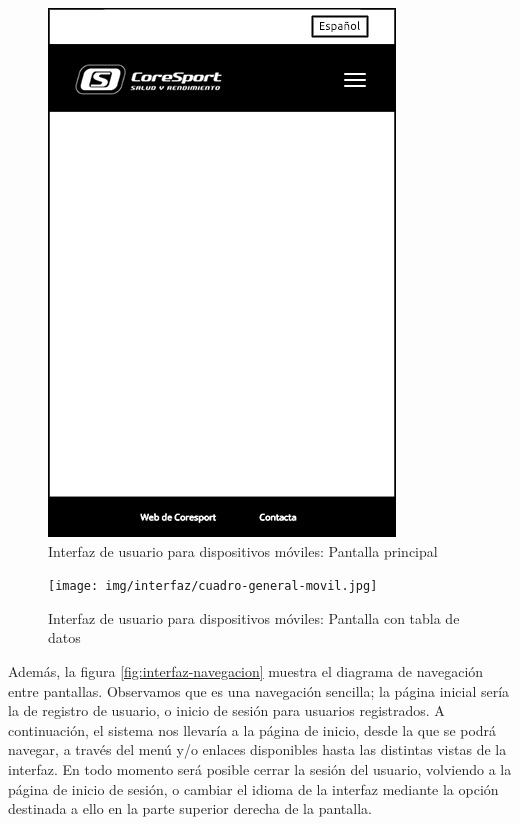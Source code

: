 \begin{figure}[h!]
\centering
  \includegraphics[scale=.40]{img/interfaz/pantalla-principal-movil.jpg}
  \caption{Interfaz de usuario para dispositivos móviles: Pantalla principal}
  \label{fig:interfaz-pantalla-principal-movil}
\end{figure}

\begin{figure}[h!]
\centering
  \texttt{[image: img/interfaz/cuadro-general-movil.jpg]}
  \caption{Interfaz de usuario para dispositivos móviles: Pantalla con tabla de datos}
  \label{fig:interfaz-cuadro-general-movil}
\end{figure}


Además, la figura \ref{fig:interfaz-navegacion} muestra el diagrama de navegación entre pantallas. Observamos que es una navegación sencilla; la página inicial sería la de registro de usuario, o inicio de sesión para usuarios registrados. A continuación, el sistema nos llevaría a la página de inicio, desde la que se podrá navegar, a través del menú y/o enlaces disponibles hasta las distintas vistas de la interfaz. En todo momento será posible cerrar la sesión del usuario, volviendo a la página de inicio de sesión, o cambiar el idioma de la interfaz mediante la opción destinada a ello en la parte superior derecha de la pantalla. 


